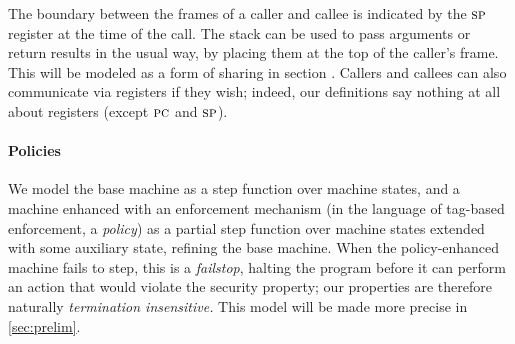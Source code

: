 \documentclass[acmsmall,review,anonymous]{acmart}\settopmatter{printfolios=true,printccs=false,printacmref=false}
\begin{document}
The boundary between the frames of a caller and callee is indicated by the $\textsc{sp}$ register
at the time of the call. The stack can be used to pass arguments or return results
in the usual way, by placing them at the top of the caller's frame. This will be modeled
as a form of sharing in section .
Callers and callees can also communicate via registers if they wish; indeed, our
definitions say nothing at all about registers (except $\textsc{pc}$ and $\textsc{sp}$).

\ifaftersubmission{}\fi

\paragraph*{Policies}

We model the base machine as a step function over machine states, and a machine enhanced with
an enforcement mechanism (in the language of tag-based enforcement, a {\em policy}) as
a partial step function over machine states extended with some auxiliary state, refining
the base machine. When the policy-enhanced machine fails to step, this is a {\em failstop},
halting the program before it can perform an action that would violate the security property;
our properties are therefore naturally \emph{termination insensitive.}
This model will be made more precise in \cref{sec:prelim}.

\end{document}
